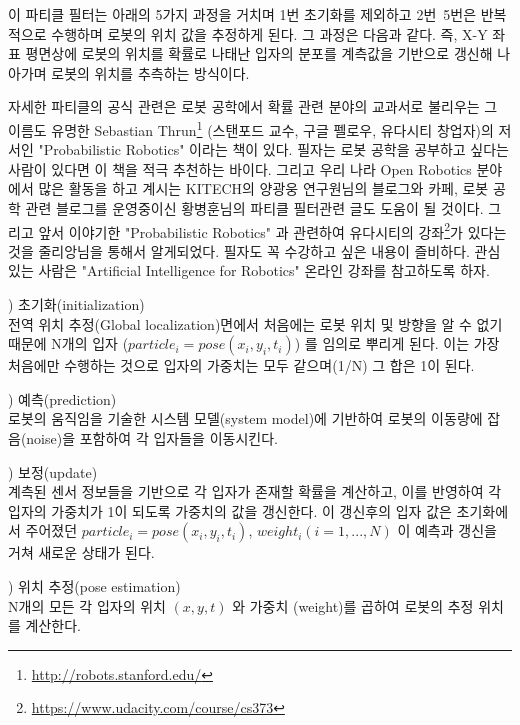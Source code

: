 이 파티클 필터는 아래의 5가지 과정을 거치며 1번 초기화를 제외하고 2번~5번은 반복적으로 수행하며 로봇의 위치 값을 추정하게 된다. 그 과정은 다음과 같다. 즉, X-Y 좌표 평면상에 로봇의 위치를 확률로 나태난 입자의 분포를 계측값을 기반으로 갱신해 나아가며 로봇의 위치를 추측하는 방식이다. 

자세한 파티클의 공식 관련은 로봇 공학에서 확률 관련 분야의 교과서로 불리우는 그 이름도 유명한 Sebastian Thrun\footnote{\url{http://robots.stanford.edu/}} (스탠포드 교수, 구글 펠로우, 유다시티 창업자)의 저서인 "Probabilistic Robotics"\cite{thrun2005probabilistic} 이라는 책이 있다. 필자는 로봇 공학을 공부하고 싶다는 사람이 있다면 이 책을 적극 추천하는 바이다. 그리고 우리 나라 Open Robotics 분야에서 많은 활동을 하고 계시는 KITECH의 양광웅 연구원님의 블로그와 카페,  로봇 공학 관련 블로그를 운영중이신 황병훈님의 파티클 필터관련 글도 도움이 될 것이다. 그리고 앞서 이야기한 "Probabilistic Robotics" 과 관련하여 유다시티의 강좌\footnote{\url{https://www.udacity.com/course/cs373}}가 있다는 것을 줄리앙님을 통해서 알게되었다. 필자도 꼭 수강하고 싶은 내용이 즐비하다. 관심 있는 사람은 "Artificial Intelligence for Robotics" 온라인 강좌를 참고하도록 하자.


\setcounter{num}{0}

\vspace{\baselineskip}
\noindent
{}
\thenum) 초기화(initialization)\\
전역 위치 추정(Global localization)면에서 처음에는 로봇 위치 및 방향을 알 수 없기 때문에 N개의 입자 ($particle_i = pose(x_i,y_i,t_i)$) 를 임의로 뿌리게 된다. 이는 가장 처음에만 수행하는 것으로 입자의 가중치는 모두 같으며(1/N) 그 합은 1이 된다. 

\vspace{\baselineskip}
\noindent
{}
\thenum) 예측(prediction)\\
로봇의 움직임을 기술한 시스템 모델(system model)에 기반하여 로봇의 이동량에 잡음(noise)을 포함하여 각 입자들을 이동시킨다.

\vspace{\baselineskip}
\noindent
{}
\thenum) 보정(update)\\
계측된 센서 정보들을 기반으로 각 입자가 존재할 확률을 계산하고, 이를 반영하여 각 입자의 가중치가 1이 되도록 가중치의 값을 갱신한다. 이 갱신후의 입자 값은 초기화에서 주어졌던 $particle_i = pose(x_i,y_i,t_i)$, $weight_i (i=1,...,N)$ 이 예측과 갱신을 거쳐 새로운 상태가 된다. 

\vspace{\baselineskip}
\noindent
{}
\thenum) 위치 추정(pose estimation)\\
N개의 모든 각 입자의 위치 $(x,y,t)$ 와 가중치 (weight)를 곱하여 로봇의 추정 위치를 계산한다.

